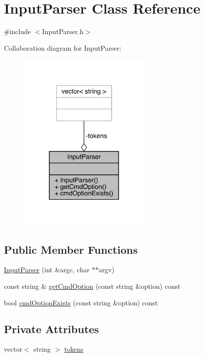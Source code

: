 \hypertarget{class_input_parser}{}\section{Input\+Parser Class Reference}
\label{class_input_parser}


{\ttfamily \#include $<$Input\+Parser.\+h$>$}



Collaboration diagram for Input\+Parser\+:\nopagebreak
\begin{figure}[H]
\begin{center}
\leavevmode
\includegraphics[width=186pt]{class_input_parser__coll__graph}
\end{center}
\end{figure}
\subsection*{Public Member Functions}
\begin{DoxyCompactItemize}
\item 
\mbox{\hyperlink{class_input_parser_af9fa5ead1f28b5294a713410df5b9531}{Input\+Parser}} (int \&argc, char $\ast$$\ast$argv)
\item 
const string \& \mbox{\hyperlink{class_input_parser_aac05d7ad7794084907a0b57ab3e7d607}{get\+Cmd\+Option}} (const string \&option) const
\item 
bool \mbox{\hyperlink{class_input_parser_ad3d06a9c59e91f425295bdc8408e0544}{cmd\+Option\+Exists}} (const string \&option) const
\end{DoxyCompactItemize}
\subsection*{Private Attributes}
\begin{DoxyCompactItemize}
\item 
vector$<$ string $>$ \mbox{\hyperlink{class_input_parser_a4bd1105d6fc64bd0e825dc2e34515d75}{tokens}}
\end{DoxyCompactItemize}


